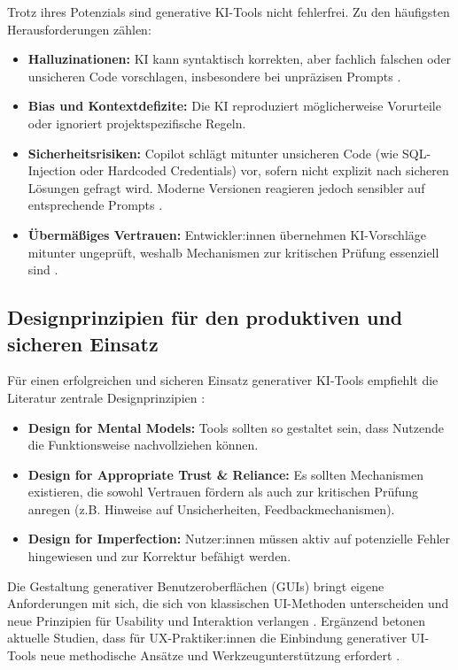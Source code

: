Trotz ihres Potenzials sind generative KI-Tools nicht fehlerfrei. Zu den
häufigsten Herausforderungen zählen:
\begin{itemize}
    \item \textbf{Halluzinationen:} KI kann syntaktisch korrekten, aber fachlich falschen oder unsicheren Code vorschlagen, insbesondere bei unpräzisen Prompts \cite{shi_ai-assisted_2023}.
    \item \textbf{Bias und Kontextdefizite:} Die KI reproduziert möglicherweise Vorurteile oder ignoriert projektspezifische Regeln.
    \item \textbf{Sicherheitsrisiken:} Copilot schlägt mitunter unsicheren Code (wie SQL-Injection oder Hardcoded Credentials) vor, sofern nicht explizit nach sicheren Lösungen gefragt wird. Moderne Versionen reagieren jedoch sensibler auf entsprechende Prompts \cite{shi_ai-assisted_2023}.
    \item \textbf{Übermäßiges Vertrauen:} Entwickler:innen übernehmen KI-Vorschläge mitunter ungeprüft, weshalb Mechanismen zur kritischen Prüfung essenziell sind \cite{weisz_design_2024}.
\end{itemize}

\subsection{Designprinzipien für den produktiven und sicheren Einsatz}

Für einen erfolgreichen und sicheren Einsatz generativer KI-Tools empfiehlt die
Literatur zentrale Designprinzipien \cite{weisz_design_2024}:
\begin{itemize}
    \item \textbf{Design for Mental Models:} Tools sollten so gestaltet sein, dass Nutzende die Funktionsweise nachvollziehen können.
    \item \textbf{Design for Appropriate Trust \& Reliance:} Es sollten Mechanismen existieren, die sowohl Vertrauen fördern als auch zur kritischen Prüfung anregen (z.B. Hinweise auf Unsicherheiten, Feedbackmechanismen).
    \item \textbf{Design for Imperfection:} Nutzer:innen müssen aktiv auf potenzielle Fehler hingewiesen und zur Korrektur befähigt werden.
\end{itemize}

Die Gestaltung generativer Benutzeroberflächen (GUIs) bringt eigene
Anforderungen mit sich, die sich von klassischen UI-Methoden unterscheiden und
neue Prinzipien für Usability und Interaktion verlangen
\cite{lee_towards_2025}. Ergänzend betonen aktuelle Studien, dass für
UX-Praktiker:innen die Einbindung generativer UI-Tools neue methodische Ansätze
und Werkzeugunterstützung erfordert \cite{chen_genui_2025}.

